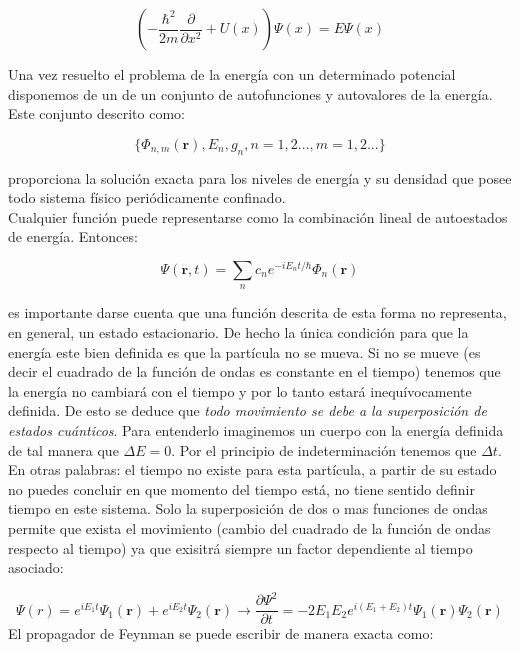 \documentclass[12pt]{article}
\newcommand{\parentesis}[1]{\left( #1  \right)}
\newcommand{\parciales}[2]{\frac{\partial #1}{\partial #2}}
\newcommand{\rn}{\mathbf{r}}
\begin{document}
\begin{equation}
\parentesis{- \dfrac{\hbar^2}{2m} \parciales{}{x^2} + U(x)} \Psi (x) = E \Psi (x) 
\end{equation}




 Una vez resuelto el problema de la energía con un determinado potencial disponemos de un de un conjunto de autofunciones y autovalores de la energía. Este conjunto descrito como:

\begin{equation}
\lbrace \Phi_{n,m} (\rn), E_n,g_n,n=1,2...,m=1,2... \rbrace
\end{equation}

proporciona la solución exacta para los niveles de energía y su densidad que posee todo sistema físico periódicamente confinado. \\

Cualquier función puede representarse como la combinación lineal de autoestados de energía. Entonces:

\begin{equation}
\Psi (\rn,t) = \sum_n c_n e^{-i E_nt/\hbar} \Phi_n(\rn)
\end{equation}

es importante darse cuenta que una función descrita de esta forma no representa, en general, un estado estacionario. De hecho la única condición para que la energía este bien definida es que la partícula no se mueva. Si no se mueve (es decir el cuadrado de la función de ondas es constante en el tiempo) tenemos que la energía no cambiará con el tiempo y por lo tanto estará inequívocamente definida. De esto se deduce que \textit{todo movimiento se debe a la superposición de estados cuánticos}. Para entenderlo imaginemos un cuerpo con la energía definida de tal manera que $\Delta E = 0$. Por el principio de indeterminación tenemos que $\Delta t$. En otras palabras: el tiempo no existe para esta partícula, a partir de su estado no puedes concluir en que momento del tiempo está, no tiene sentido definir tiempo en este sistema. Solo la superposición de dos o mas funciones de ondas permite que exista el movimiento (cambio del cuadrado de la función de ondas respecto al tiempo) ya que exisitrá siempre un factor dependiente al tiempo asociado:

\begin{equation}
\Psi (r) = e^{i E_1 t} \Psi_1(\rn) + e^{i E_2 t}\Psi_2 (\rn)  \longrightarrow \parciales{ \Psi^{2}}{t} =  -2 E_1 E_2 e^{i (E_1 + E_2) t} \Psi_1 (\rn) \Psi_2 (\rn)
\end{equation}
El propagador de Feynman se puede escribir de manera exacta como:
\end{document}
